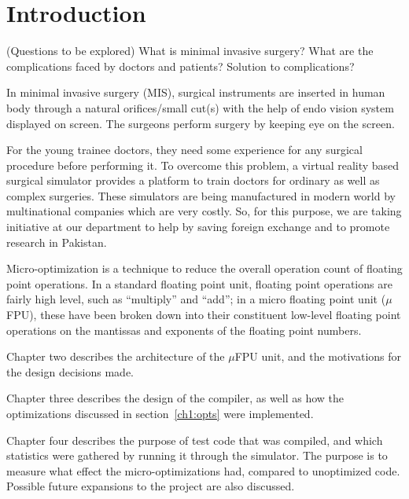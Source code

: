 \chapter{Introduction}


(Questions to be explored)
What is minimal invasive surgery?
What are the complications faced by doctors and patients?
Solution to complications?


In minimal invasive surgery (MIS), surgical instruments are inserted in human body through a natural orifices/small cut(s) with the help of endo vision system displayed on screen. The surgeons perform surgery by keeping eye on the screen. 

For the young trainee doctors, they need some experience for any surgical procedure before performing it. To overcome this problem, a virtual reality based surgical simulator provides a platform to train doctors for ordinary as well as complex surgeries. These simulators are being manufactured in modern world by multinational companies which are very costly. So, for this purpose, we are taking initiative at our department to help by saving foreign exchange and to promote research in Pakistan.








Micro-optimization is a technique to reduce the overall operation count of
floating point operations.  In a standard floating point unit, floating
point operations are fairly high level, such as ``multiply'' and ``add'';
in a micro floating point unit ($\mu$FPU), these have been broken down into
their constituent low-level floating point operations on the mantissas and
exponents of the floating point numbers.

Chapter two describes the architecture of the $\mu$FPU unit, and the
motivations for the design decisions made.

Chapter three describes the design of the compiler, as well as how the
optimizations discussed in section~\ref{ch1:opts} were implemented.

Chapter four describes the purpose of test code that was compiled, and which
statistics were gathered by running it through the simulator.  The purpose
is to measure what effect the micro-optimizations had, compared to
unoptimized code.  Possible future expansions to the project are also
discussed.

